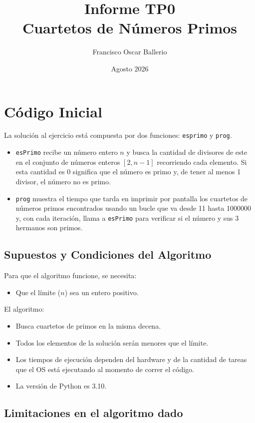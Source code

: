 \documentclass[12pt,a4paper]{article}
\title{\textbf{Informe TP0}\\[0.4em] \large Cuartetos de Números Primos}
\author{Francisco Oscar Ballerio}
\date{Agosto 2026}
\begin{document}
\maketitle

\section{Código Inicial}

La solución al ejercicio está compuesta por dos funciones: \texttt{esprimo} y \texttt{prog}.
\begin{itemize}
  \item \texttt{esPrimo} recibe un número entero $n$ y busca la cantidad de divisores de este en el conjunto de números enteros $[2, n-1]$ recorriendo cada elemento. Si esta cantidad es 0 significa que el número es primo y, de tener al menos 1 divisor, el número no es primo.
  \item \texttt{prog} muestra el tiempo que tarda en imprimir por pantalla los cuartetos de números primos encontrados usando un bucle que va desde 11 hasta 1000000 y, con cada iteración, llama a \texttt{esPrimo} para verificar si el número y sus 3 hermanos son primos.
\end{itemize}

\subsection{Supuestos y Condiciones del Algoritmo}

Para que el algoritmo funcione, se necesita:
\begin{itemize}
  \item Que el límite ($n$) sea un entero positivo.
\end{itemize}

El algoritmo:
\begin{itemize}
  \item Busca cuartetos de primos en la misma decena.
  \item Todos los elementos de la solución serán menores que el límite.
  \item Los tiempos de ejecución dependen del hardware y de la cantidad de tareas que el OS está ejecutando al momento de correr el código.
  \item La versión de Python es 3.10.
\end{itemize}

\subsection{Limitaciones en el algoritmo dado}
\end{document}
